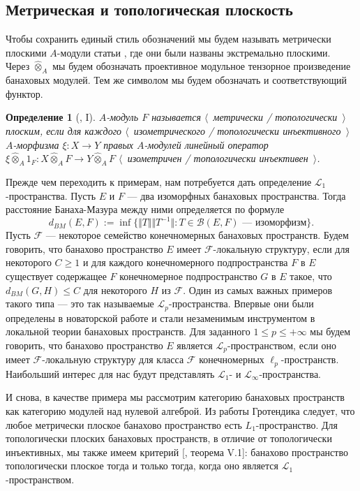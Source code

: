 \documentclass[12pt]{article}
\newcommand{\projmodtens}[1]{\mathbin{\widehat{\otimes}}_{#1}}
\newtheorem{definition}[theorem]{Определение}
\begin{document}
\subsection{Метрическая и топологическая плоскость}
\label{SubSectionMetricAndTopologicalFlatness}

Чтобы сохранить единый стиль обозначений мы будем называть метрически плоскими $A$-модули статьи \cite{HelMetrFlatNorMod}, где они были названы экстремально плоскими. Через $\projmodtens{A}$ мы будем обозначать проективное модульное тензорное произведение банаховых модулей. Тем же символом мы будем обозначать и соответствующий функтор.

\begin{definition}[\cite{HelMetrFlatNorMod}, I]\label{MetTopFlatMod} $A$-модуль $F$ называется $\langle$~метрически / топологически~$\rangle$ плоским, если для каждого $\langle$~изометрического / топологически инъективного~$\rangle$ $A$-морфизма $\xi:X\to Y$ правых $A$-модулей линейный оператор $\xi\projmodtens{A} 1_F:X\projmodtens{A} F\to Y\projmodtens{A} F$ $\langle$~изометричен / топологически инъективен~$\rangle$.
\end{definition}

Прежде чем переходить к примерам, нам потребуется дать определение $\mathscr{L}_1$-пространства. Пусть $E$ и $F$ --- два изоморфных банаховых пространства. Тогда расстояние Банаха-Мазура между ними определяется по формуле 
$$
d_{BM}(E,F):=\inf\{\Vert T\Vert\Vert T^{-1}\Vert: T \in \mathcal{B}(E,F) \mbox{ --- изоморфизм}\}.
$$ 
Пусть $\mathcal{F}$ --- некоторое семейство конечномерных банаховых пространств. Будем говорить, что банахово пространство $E$ имеет $\mathcal{F}$-локальную структуру, если для некоторого $C\geq 1$ и для каждого конечномерного подпространства $F$ в $E$ существует содержащее $F$ конечномерное подпространство $G$ в $E$ такое, что $d_{BM}(G,H)\leq C$ для некоторого $H$ из $\mathcal{F}$. Один из самых важных примеров такого типа --- это так называемые $\mathscr{L}_p$-пространства. Впервые они были определены в новаторской работе \cite{LinPelAbsSumOpInLpSpAndApp} и стали незаменимым инструментом в локальной теории банаховых пространств. Для заданного $1\leq p\leq +\infty$ мы будем говорить, что банахово пространство $E$ является $\mathscr{L}_p$-пространством, если оно имеет $\mathcal{F}$-локальную структуру для класса $\mathcal{F}$ конечномерных $\ell_p$-пространств. Наибольший интерес для нас будут представлять $\mathscr{L}_1$- и $\mathscr{L}_\infty$-пространства.

И снова, в качестве примера мы рассмотрим категорию банаховых пространств как категорию модулей над нулевой алгеброй. Из работы Гротендика \cite{GrothMetrProjFlatBanSp} следует, что любое метрически плоское банахово пространство есть $L_1$-пространство. Для топологически плоских банаховых пространств, в отличие от топологически инъективных, мы также имеем критерий [\cite{StegRethNucOpL1LInfSp}, теорема V.1]: банахово пространство топологически плоское тогда и только тогда, когда оно является $\mathscr{L}_1$-пространством.
\end{document}
